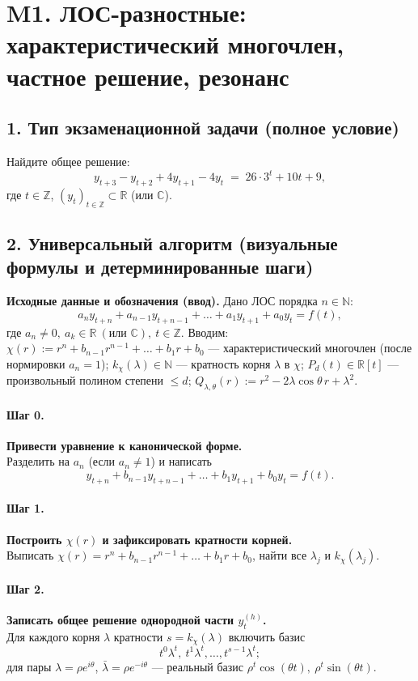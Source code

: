 \section{M1. ЛОС-разностные: характеристический многочлен, частное решение, резонанс}

\subsection*{1. Тип экзаменационной задачи (полное условие)}
Найдите общее решение:
\[
y_{t+3}-y_{t+2}+4y_{t+1}-4y_{t} \;=\; 26\cdot 3^{t} + 10t + 9,
\]
где \(t\in\mathbb Z\), \((y_t)_{t\in\mathbb Z}\subset\mathbb R\) (или \(\mathbb C\)).

\subsection*{2. Универсальный алгоритм (визуальные формулы и детерминированные шаги)}

\textbf{Исходные данные и обозначения (ввод).} Дано ЛОС порядка \(n\in\mathbb N\):
\[
a_n y_{t+n} + a_{n-1} y_{t+n-1} + \dots + a_1 y_{t+1} + a_0 y_t = f(t),
\]
где \(a_n\neq 0,\ a_k\in\mathbb R\ (\text{или }\mathbb C),\ t\in\mathbb Z\).
Вводим: \(\chi(r):=r^n+b_{n-1}r^{n-1}+\dots+b_1 r + b_0\) — характеристический многочлен (после нормировки \(a_n=1\));
\(k_\chi(\lambda)\in\mathbb N\) — кратность корня \(\lambda\) в \(\chi\);
\(P_d(t)\in\mathbb R[t]\) — произвольный полином степени \(\le d\);
\(Q_{\lambda,\theta}(r):=r^2-2\lambda\cos\theta\,r+\lambda^2\).

\paragraph{Шаг 0.} \textbf{Привести уравнение к канонической форме.}\\
Разделить на \(a_n\) (если \(a_n\neq 1\)) и написать
\[
y_{t+n} + b_{n-1} y_{t+n-1} + \dots + b_1 y_{t+1} + b_0 y_t = f(t).
\]

\paragraph{Шаг 1.} \textbf{Построить \(\chi(r)\) и зафиксировать кратности корней.}\\
Выписать \(\chi(r)=r^{n}+b_{n-1}r^{n-1}+\dots+b_1 r + b_0\), найти все \(\lambda_j\) и \(k_\chi(\lambda_j)\).

\paragraph{Шаг 2.} \textbf{Записать общее решение однородной части \(y^{(h)}_t\).}\\
Для каждого корня \(\lambda\) кратности \(s=k_\chi(\lambda)\) включить базис
\[
t^0\lambda^{t},\ t^1\lambda^{t},\dots,t^{s-1}\lambda^{t};
\]
для пары \(\lambda=\rho e^{i\theta}\), \(\bar\lambda=\rho e^{-i\theta}\) — реальный базис \(\rho^{t}\cos(\theta t),\ \rho^{t}\sin(\theta t)\).

